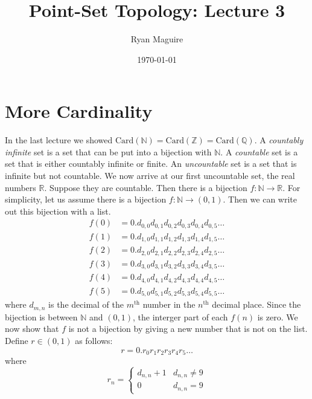 \documentclass{article}
\title{Point-Set Topology: Lecture 3}
\author{Ryan Maguire}
\date{\today}
\theoremstyle{plain}
\theoremstyle{normal}
\begin{document}
    \maketitle
    \section{More Cardinality}
        In the last lecture we showed
        $\textrm{Card}(\mathbb{N})=\textrm{Card}(\mathbb{Z})=\textrm{Card}(\mathbb{Q})$.
        A \textit{countably infinite} set is a set that can be put into a
        bijection with $\mathbb{N}$. A \textit{countable} set is a set that
        is either countably infinite or finite. An \textit{uncountable} set is
        a set that is infinite but not countable. We now arrive at our first
        uncountable set, the real numbers $\mathbb{R}$. Suppose they are
        countable. Then there is a bijection
        $f:\mathbb{N}\rightarrow\mathbb{R}$. For simplicity, let us assume there
        is a bijection $f:\mathbb{N}\rightarrow(0,1)$. Then we can write out
        this bijection with a list.
        \begin{align}
            f(0)&=0.d_{0,0}d_{0,1}d_{0,2}d_{0,3}d_{0,4}d_{0,5}\dots\\
            f(1)&=0.d_{1,0}d_{1,1}d_{1,2}d_{1,3}d_{1,4}d_{1,5}\dots\\
            f(2)&=0.d_{2,0}d_{2,1}d_{2,2}d_{2,3}d_{2,4}d_{2,5}\dots\\
            f(3)&=0.d_{3,0}d_{3,1}d_{3,2}d_{3,3}d_{3,4}d_{3,5}\dots\\
            f(4)&=0.d_{4,0}d_{4,1}d_{4,2}d_{4,3}d_{4,4}d_{4,5}\dots\\
            f(5)&=0.d_{5,0}d_{5,1}d_{5,2}d_{5,3}d_{5,4}d_{5,5}\dots
        \end{align}
        where $d_{m,n}$ is the decimal of the $m^{\textrm{th}}$ number in the
        $n^{\textrm{th}}$ decimal place. Since the bijection is between
        $\mathbb{N}$ and $(0,1)$, the interger part of each $f(n)$ is zero.
        We now show that $f$ is not a bijection by giving a new number that is
        not on the list. Define $r\in(0,1)$ as follows:
        \begin{equation}
            r=0.r_{0}r_{1}r_{2}r_{3}r_{4}r_{5}\dots
        \end{equation}
        where
        \begin{equation}
            r_{n}=
            \begin{cases}
                d_{n,n}+1&d_{n,n}\ne{9}\\
                0&d_{n,n}=9
            \end{cases}
        \end{equation}
\end{document}
